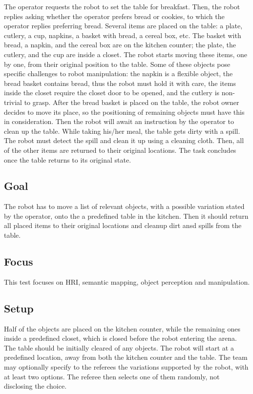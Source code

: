 The operator requests the robot to set the table for breakfast. Then, the robot replies asking whether the operator prefers bread or cookies, to which the operator replies preferring bread.  Several items are placed on the table: a plate, cutlery, a cup, napkins, a basket with bread, a cereal box, etc. The basket with bread, a napkin, and the cereal box are on the kitchen counter; the plate, the cutlery, and the cup are inside a closet. The robot starts moving these items, one by one, from their original position to the table. Some of these objects pose specific challenges to robot manipulation: the napkin is a flexible object, the bread basket contains bread, thus the robot must hold it with care, the items inside the closet require the closet door to be opened, and the cutlery is non-trivial to grasp. After the bread basket is placed on the table, the robot owner decides to move its place, so the positioning of remaining objects must have this in consideration. Then the robot will await an instruction by the operator to clean up the table. While taking his/her meal, the table gets dirty with a spill. The robot must detect the spill and clean it up using a cleaning cloth. Then, all of the other items are returned to their original locations. The task concludes once the table returns to its original state.

\subsection{Goal}

The robot has to move a list of relevant objects, with a possible variation stated by the operator, onto the a predefined table in the kitchen. Then it should return all placed items to their original locations and cleanup dirt ansd spills from the table.

\subsection{Focus}

This test focuses on HRI, semantic mapping, object perception and manipulation.

\subsection{Setup}

Half of the objects are placed on the kitchen counter, while the remaining ones inside a predefined closet, which is closed before the robot entering the arena. The table should be initially cleared of any objects. The robot will start at a predefined location, away from both the kitchen counter and the table. The team may optionally specify to the referees the variations supported by the robot, with at least two options. The referee then selects one of them randomly, not disclosing the choice.

